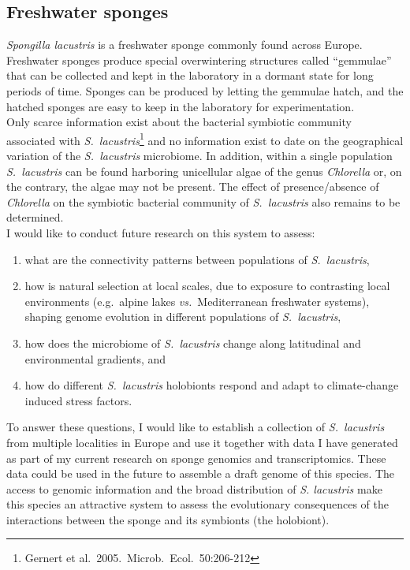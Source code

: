 \documentclass[a4paper,11pt]{article}
\begin{document}
\subsection*{Freshwater sponges}

\emph{Spongilla lacustris} is a freshwater sponge commonly found across Europe. Freshwater sponges produce special overwintering structures called ``gemmulae'' that can be collected and kept in the laboratory in a dormant state for long periods of time. Sponges can be produced by letting the gemmulae hatch, and the hatched sponges are easy to keep in the laboratory for experimentation.\\

Only scarce information exist about the bacterial symbiotic community associated with \emph{S.~lacustris}\footnote{Gernert et al.~2005.~Microb.~Ecol.~50:206-212} and no information exist to date on the geographical variation of the \emph{S.~lacustris} microbiome. In addition, within a single population \emph{S.~lacustris} can be found harboring unicellular algae of the genus \emph{Chlorella} or, on the contrary, the algae may not be present. The effect of presence/absence of \emph{Chlorella} on the symbiotic bacterial community of \emph{S.~lacustris} also remains to be determined. \\

I would like to conduct future research on this system to assess:
\begin{enumerate}
\item what are the connectivity patterns between populations of \emph{S.~lacustris},
\item how is natural selection at local scales, due to exposure to contrasting local environments (e.g.~alpine lakes \emph{vs.}~Mediterranean freshwater systems), shaping genome evolution in different populations of \emph{S.~lacustris},
\item how does the microbiome of \emph{S.~lacustris} change along latitudinal and environmental gradients, and
\item how do different \emph{S.~lacustris} holobionts respond and adapt to climate-change induced stress factors.
\end{enumerate}

To answer these questions, I would like to establish a collection of \emph{S.~lacustris} from multiple localities in Europe and use it together with data I have generated as part of my current research on sponge genomics and transcriptomics. These data could be used in the future to assemble a draft genome of this species. The access to genomic information and the broad distribution of \emph{S. lacustris} make this species an attractive system to assess the evolutionary consequences of the interactions between the sponge and its symbionts (the holobiont).
\end{document}
